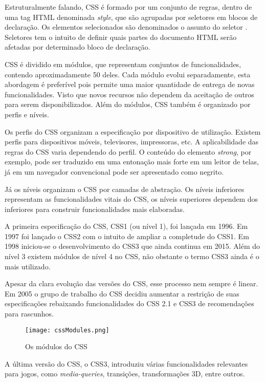 Estruturalmente falando, CSS é formado por um conjunto de regras,
dentro de uma tag HTML denominada \textit{style}, que são agrupadas
por seletores em blocos de declaração. Os elementos selecionados são
denominados o assunto do seletor \autocite{cssSelectors}. Seletores tem
o intuito de definir quais partes do documento HTML serão afetadas por
determinado bloco de declaração.

CSS é dividido em módulos, que representam conjuntos de
funcionalidades, contendo aproximadamente 50 deles. Cada módulo evolui
separadamente, esta abordagem é preferível pois permite uma maior
quantidade de entrega de novas funcionalidades. Visto que novos recursos
não dependem da aceitação de outros para serem disponibilizados.
Além do módulos, CSS também é organizado por perfis e níveis.

Os perfis do CSS organizam a especificação por dispositivo de
utilização. Existem perfis para dispositivos móveis, televisores,
impressoras, etc. A aplicabilidade das regras do CSS varia dependendo do
perfil. O conteúdo do elemento \textit{strong}, por exemplo, pode ser
traduzido em uma entonação mais forte em um leitor de telas, já em um
navegador convencional pode ser apresentado como negrito.

Já os níveis organizam o CSS por camadas de abstração. Os níveis
inferiores representam as funcionalidades vitais do CSS, os níveis
superiores dependem dos inferiores para construir funcionalidades
mais elaboradas.

A primeira especificação do CSS, CSS1 (ou nível 1), foi lançada em
1996. Em 1997 foi lançado o CSS2 com o intuito de ampliar a completude
do CSS1. Em 1998 iniciou-se o desenvolvimento do CSS3 que ainda continua
em 2015. Além do nível 3 existem módulos de nível 4 no CSS, não
obstante o termo CSS3 ainda é o mais utilizado.

Apesar da clara evolução das versões do CSS, esse processo nem
sempre é linear. Em 2005 o grupo de trabalho do CSS decidiu aumentar a
restrição de suas especificações rebaixando funcionalidades do CSS
2.1 e CSS3 de recomendações para rascunhos.

\begin{figure}[H]
    \centering
    \texttt{[image: cssModules.png]}
    \caption{Os módulos do CSS}
\end{figure}

A última versão do CSS, o CSS3, introduziu várias funcionalidades
relevantes para jogos, como \textit{media-queries}, transições,
transformações 3D, entre outros.

